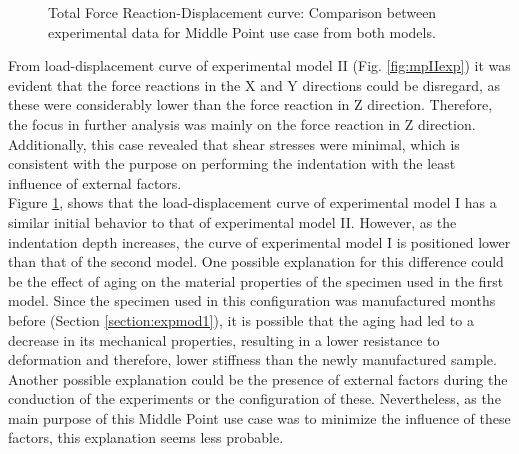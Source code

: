 \begin{figure}%
    \centering
   \quad
   \caption[Middle Point experimental data]{Total Force Reaction-Displacement curve: Comparison between experimental data for Middle Point use case from both models.}%
   \label{fig:midpointexpIvsexpII}%
\end{figure}

From load-displacement curve of experimental model II (Fig. \ref{fig:mpIIexp}) it was evident that the
force reactions in the X and Y directions could be disregard, as these were considerably lower than
the force reaction in Z direction. Therefore, the focus in further analysis was mainly 
on the force reaction in Z direction. Additionally, this case revealed that shear stresses were minimal, 
which is consistent with the purpose on performing the indentation with the least influence of external factors.\\

Figure \ref{fig:midpointexpIvsexpII}, shows that the load-displacement curve
of experimental model I has a similar initial behavior to that of experimental model II.
However, as the indentation depth increases, the curve of experimental model I is positioned 
lower than that of the second model. One possible explanation for this difference could be the effect of aging 
on the material properties of the specimen used in the first model. Since the specimen used in this 
configuration was manufactured months before (Section \ref{section:expmod1}), it is possible that the aging 
had led to a decrease in its mechanical properties, resulting in a lower resistance to deformation
and therefore, lower stiffness than the newly manufactured sample.
Another possible explanation could be the presence of external factors during the conduction of 
the experiments or the configuration of these. Nevertheless, as the main purpose of this Middle Point 
use case was to minimize the influence of these factors, this explanation seems less probable.

